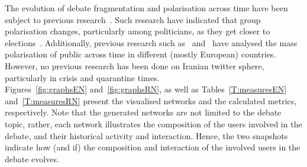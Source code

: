 \documentclass[journal,11pt]{IEEEtran}
\begin{document}
The evolution of debate fragmentation and polarisation across time have been subject to previous research~\cite{garimella2017long,yardi2010dynamic,barbera2014social,garcia2015ideological}. Such research have indicated that group polarisation changes, particularly among politicians, as they get closer to elections~\cite{lietz2014politicians}. Additionally, previous research such as~\cite{bright2018explaining} and~\cite{garcia2015ideological} have analysed the mass polarisation of public across time in different (mostly European) countries. However, no previous research has been done on Iranian twitter sphere, particularly in crisis and quarantine times. \\

Figures~\ref{fig:graphsEN} and~\ref{fig:graphsRN}, as well as Tables~\ref{T:measuresEN} and~\ref{T:measuresRN} present the visualised networks and the calculated metrics, respectively. Note that the generated networks are not limited to the debate topic, rather, each network illustrates the composition of the users involved in the debate, and their historical activity and interaction. Hence, the two snapshots indicate how (and if) the composition and interaction of the involved users in the debate evolves. \\
\end{document}
